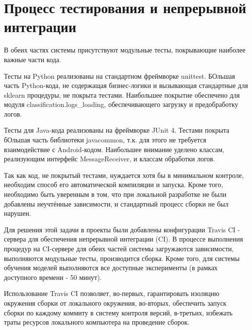 
\section{Процесс тестирования и непрерывной интеграции}

В обеих частях системы присутствуют модульные тесты, покрывающие наиболее важные части кода. 

Тесты на Python реализованы на стандартном фреймворке unittest. БОльшая часть Python-кода, не содержащая бизнес-логики и вызывающая стандартные для sklearn процедуры, не покрыта тестами. Наибольшее покрытие обеспечено для модуля classification.logs\_loading, обеспечивающего загрузку и предобработку логов.

Тесты для Java-кода реализованы на фреймворке JUnit 4. Тестами покрыта бОльшая часть библиотеки javacommon, т.к. для этого не требуется взаимодействие с Android-кодом. Наибольшее внимание уделено классам, реализующим интерфейс MessageReceiver, и классам обработки логов.

Так как код, не покрытый тестами, нуждается хотя бы в минимальном контроле, необходим способ его автоматической компиляции и запуска. Кроме того, необходимо быть уверенным в том, что при локальной разработке не были добавлены неучтённые зависимости, и стандартный процесс сборки не был нарушен. 

Для решения этой задачи в проекты были добавлены конфигурации Travis CI - сервера для обеспечения непрерывной интеграции (CI). В процессе выполнения процедур на CI-сервере для обеих частей системы загружаются зависимости, выполняются модульные тесты, производится сборка. Кроме того, для системы обучения моделей выполняются все доступные эксперименты (в рамках доступного времени - 50 минут). 

Использование Travis CI позволяет, во-первых, гарантировать изоляцию окружения сборки от локального окружения, во-вторых, обеспечить запуск сборки по каждому коммиту в систему контроля версий, в-третьих, избежать траты ресурсов локального компьютера на проведение сборок. 